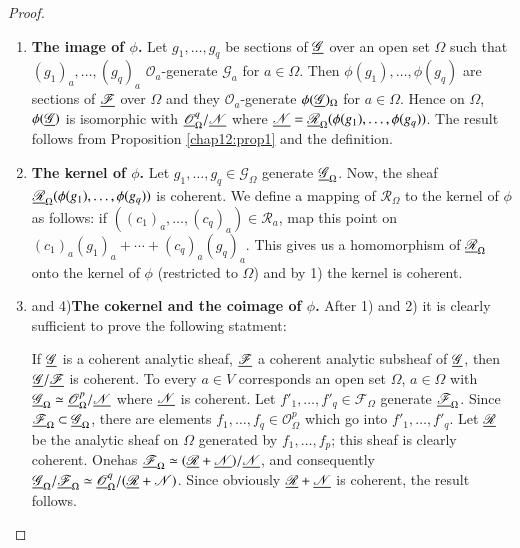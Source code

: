 \begin{proof}
\begin{enumerate}
\renewcommand{\labelenumi}{\theenumi)}
\item \textbf{The image of $\phi$.} Let $g_1, \ldots, g_q$ be sections of
  $\underline{\mathscr{G}}$  over an open set $\Omega$ such that $(g_1)_a,
  \ldots, (g_q)_a$ $\mathscr{O}_a$-generate $\mathscr{G}_a$ for $a \in
  \Omega$. Then $\phi(g_1), \ldots, \phi(g_q)$ are sections of
  $\underline{\mathscr{F}}$ over $\Omega$ and they $\mathscr{O}_a$-generate
  $\phi(\underline{\mathscr{G}})_\Omega$ for $a \in \Omega$. Hence on
  $\Omega$, $\phi(\underline{\mathscr{G}})$ is isomorphic with
  $\underline{\mathscr{O}}^q_\Omega/ \underline{\mathscr{N}}$ where $\underline{\mathscr{N}} =
  \underline{\mathscr{R}}_\Omega (\phi(g_1), \ldots, \phi(g_q))$. The result
  follows from Proposition \ref{chap12:prop1} and the definition.

\item \textbf{The kernel of $\phi$.} Let $g_1, \ldots, g_q \in
  \mathscr{G}_\Omega$ generate $\underline{\mathscr{G}}_\Omega$. Now, the
  sheaf $\underline{\mathscr{R}}_\Omega (\phi(g_1), \ldots, \phi(g_q))$ is
  coherent. We define a mapping of $\mathscr{R}_\Omega$ to the kernel
  of $\phi$ as follows: if $((c_1)_a, \ldots, (c_q)_a) \in
  \mathscr{R}_a$, map this point on $(c_1)_a (g_1)_a + \cdots +
  (c_q)_a (g_q)_a$. This gives us a homomorphism of
  $\underline{\mathscr{R}}_\Omega$ onto the kernel of $\phi$ (restricted to
  $\Omega$) and by 1) the kernel is coherent. 

\item and 4)\textbf{The cokernel and the coimage of $\phi$.} After 1)
  and 2) it is clearly sufficient to prove the following statment:

If $\underline{\mathscr{G}}$ is a coherent analytic sheaf, $\underline{\mathscr{F}}$ a
coherent analytic subsheaf of $\underline{\mathscr{G}}$, then
$\underline{\mathscr{G}}/ \underline{\mathscr{F}}$ is coherent. To every $a \in V$
corresponds an open set $\Omega$, $a \in\Omega$ with
$\underline{\mathscr{G}}_\Omega \simeq \underline{\mathscr{O}}^p_\Omega/
\underline{\mathscr{N}}$ where $\underline{\mathscr{N}}$ is coherent. Let $f'_1,
\ldots, f'_q \in \mathscr{F}_\Omega$ generate
$\underline{\mathscr{F}}_\Omega$. Since $\underline{\mathscr{F}}_\Omega \subset
  \underline{\mathscr{G}}_\Omega$, there are elements $f_1, \ldots, f_q \in
  \mathscr{O}^p_\Omega$ which go into $f'_1, \ldots, f'_q$. Let
  $\underline{\mathscr{R}}$ be the analytic sheaf on $\Omega$ generated by
  $f_1, \ldots, f_p$; this sheaf is clearly
  coherent. One\pageoriginale has $\underline{\mathscr{F}}_\Omega \simeq
  (\underline{\mathscr{R}} + \underline{\mathscr{N}})/\underline{\mathscr{N}}$, and
  consequently $\underline{\mathscr{G}}_\Omega /\underline{\mathscr{F}}_\Omega \simeq
  \underline{\mathscr{O}}^q_\Omega / (\underline{\mathscr{R}} + \mathscr{N})$. Since
  obviously $\underline{\mathscr{R}} + \underline{\mathscr{N}}$ is coherent, the
  result follows. 
\end{enumerate}
\end{proof}


